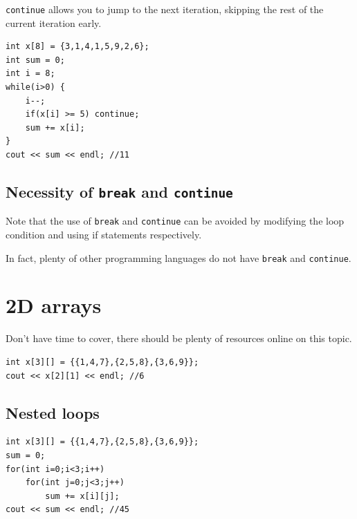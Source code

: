 \texttt{continue} allows you to jump to the next iteration, skipping the rest of the current iteration early.

\begin{lstlisting}
int x[8] = {3,1,4,1,5,9,2,6};
int sum = 0;
int i = 8;
while(i>0) {
    i--;
    if(x[i] >= 5) continue;
    sum += x[i];
}
cout << sum << endl; //11
\end{lstlisting}

\subsection{Necessity of \texttt{break} and \texttt{continue}}




Note that the use of \texttt{break} and \texttt{continue} can be avoided by modifying the loop condition and using if statements respectively. 

In fact, plenty of other programming languages do not have \texttt{break} and \texttt{continue}. 

\section{2D arrays}

Don't have time to cover, there should be plenty of resources online on this topic.

\begin{lstlisting}
int x[3][] = {{1,4,7},{2,5,8},{3,6,9}};
cout << x[2][1] << endl; //6
\end{lstlisting}

\subsection{Nested loops}

\begin{lstlisting}
int x[3][] = {{1,4,7},{2,5,8},{3,6,9}};
sum = 0;
for(int i=0;i<3;i++)
    for(int j=0;j<3;j++)
        sum += x[i][j];
cout << sum << endl; //45
\end{lstlisting}

